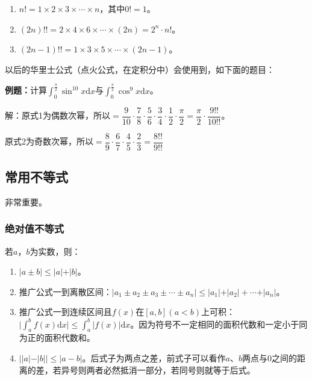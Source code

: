 \documentclass[UTF8, 12pt]{ctexart}
\begin{document}
        \begin{enumerate}
            \item $n!=1\times 2\times 3\times\cdots\times n$，其中$0!=1$。
            \item $(2n)!!=2\times 4\times 6\times\cdots\times(2n)=2^n\cdot n!$。
            \item $(2n-1)!!=1\times 3\times 5\times\cdots\times(2n-1)$。
        \end{enumerate}

        以后的华里士公式（点火公式，在定积分中）会使用到，如下面的题目：

        \textbf{例题：}计算$\int_0^{\frac{\pi}{2}}\sin^{10}x\textrm{d}x$与$\int_0^{\frac{\pi}{2}}\cos^9x\textrm{d}x$。\medskip

        解：原式1为偶数次幂，所以$=\dfrac{9}{10}\cdot\dfrac{7}{8}\cdot\dfrac{5}{6}\cdot\dfrac{3}{4}\cdot\dfrac{1}{2}\cdot\dfrac{\pi}{2}=\dfrac{\pi}{2}\cdot\dfrac{9!!}{10!!}$。\medskip

        原式2为奇数次幂，所以$=\dfrac{8}{9}\cdot\dfrac{6}{7}\cdot\dfrac{4}{5}\cdot\dfrac{2}{3}=\dfrac{8!!}{9!!}$

        \subsection{常用不等式}

        非常重要。

        \subsubsection{绝对值不等式}

        若$a$，$b$为实数，则：

        \begin{enumerate}
            \item $\vert a\pm b\vert\leqslant\vert a\vert+\vert b\vert$。
            \item 推广公式一到离散区间：$\vert a_1\pm a_2\pm a_3\pm\cdots\pm a_n\vert\leqslant\vert a_1\vert+\vert a_2\vert+\cdots+\vert a_n\vert$。
            \item 推广公式一到连续区间且$f(x)$在$[a,b](a<b)$上可积：$\vert\int_a^bf(x)\textrm{d}x\vert\leqslant\int_a^b\vert f(x)\vert\textrm{d}x$。因为符号不一定相同的面积代数和一定小于同为正的面积代数和。
            \item $\vert\vert a\vert-\vert b\vert\vert\leqslant\vert a-b\vert$。后式子为两点之差，前式子可以看作$a$、$b$两点与0之间的距离的差，若异号则两者必然抵消一部分，若同号则就等于后式。
        \end{enumerate}
\end{document}
